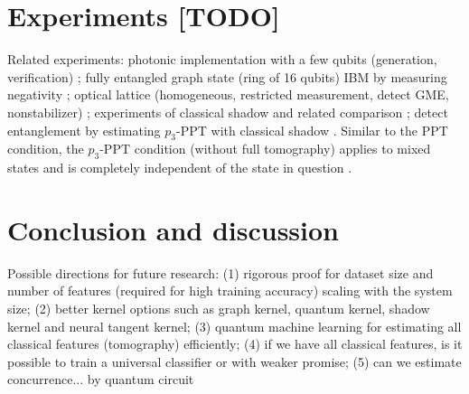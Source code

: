\documentclass[
reprint,
aps,
pra,
floatfix,
]{revtex4-2}
\theoremstyle{plain}
\theoremstyle{definition}
\newcommand{\dm}{\rho}
\begin{document}
\section{Experiments [TODO]}\label{sec:experiments}
Related experiments: photonic implementation with a few qubits (generation, verification) \cite{luEntanglementStructureEntanglement2018};
fully entangled graph state (ring of 16 qubits) IBM by measuring negativity \cite{wang16qubitIBMUniversal2018};
optical lattice (homogeneous, restricted measurement, detect GME, nonstabilizer) \cite{zhouSchemeCreateVerify2022};
experiments of classical shadow and related comparison \cite{zhangExperimentalQuantumState2021};
detect entanglement by estimating $p_3$-PPT with classical shadow \cite{elbenMixedstateEntanglementLocal2020}.
Similar to the PPT condition, the $p_3$-PPT condition (without full tomography) applies to mixed states and is completely independent of the state in question \cite{elbenMixedstateEntanglementLocal2020}. 

\section{Conclusion and discussion}
Possible directions for future research:
(1) rigorous proof for dataset size and number of features (required for high training accuracy) scaling with the system size;
(2) better kernel options such as graph kernel, quantum kernel, shadow kernel and neural tangent kernel;
(3) quantum machine learning for estimating all classical features (tomography) efficiently;
(4) if we have all classical features, is it possible to train a universal classifier or with weaker promise;
(5) can we estimate concurrence... by quantum circuit


\begin{acknowledgments}
\end{acknowledgments}



%


\onecolumngrid
\appendix



\end{document}
